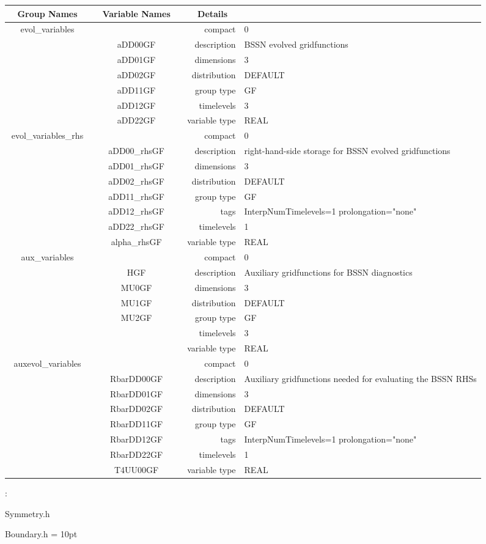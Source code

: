\begin{tabular*}{150mm}{|c|c@{\extracolsep{\fill}}|rl|} \hline 
~ {\bf Group Names} ~ & ~ {\bf Variable Names} ~  &{\bf Details} ~ & ~\\ 
\hline 
evol\_variables &  & compact & 0 \\ 
 & aDD00GF & description & BSSN evolved gridfunctions \\ 
 & aDD01GF & dimensions & 3 \\ 
 & aDD02GF & distribution & DEFAULT \\ 
 & aDD11GF & group type & GF \\ 
 & aDD12GF & timelevels & 3 \\ 
 & aDD22GF & variable type & REAL \\ 
\hline 
evol\_variables\_rhs &  & compact & 0 \\ 
 & aDD00\_rhsGF & description & right-hand-side storage for BSSN evolved gridfunctions \\ 
 & aDD01\_rhsGF & dimensions & 3 \\ 
 & aDD02\_rhsGF & distribution & DEFAULT \\ 
 & aDD11\_rhsGF & group type & GF \\ 
 & aDD12\_rhsGF & tags & InterpNumTimelevels=1 prolongation="none" \\ 
 & aDD22\_rhsGF & timelevels & 1 \\ 
 & alpha\_rhsGF & variable type & REAL \\ 
\hline 
aux\_variables &  & compact & 0 \\ 
 & HGF & description & Auxiliary gridfunctions for BSSN diagnostics \\ 
 & MU0GF & dimensions & 3 \\ 
 & MU1GF & distribution & DEFAULT \\ 
 & MU2GF & group type & GF \\ 
 &  & timelevels & 3 \\ 
 &  & variable type & REAL \\ 
\hline 
auxevol\_variables &  & compact & 0 \\ 
 & RbarDD00GF & description & Auxiliary gridfunctions needed for evaluating the BSSN RHSs \\ 
 & RbarDD01GF & dimensions & 3 \\ 
 & RbarDD02GF & distribution & DEFAULT \\ 
 & RbarDD11GF & group type & GF \\ 
 & RbarDD12GF & tags & InterpNumTimelevels=1 prolongation="none" \\ 
 & RbarDD22GF & timelevels & 1 \\ 
 & T4UU00GF & variable type & REAL \\ 
\hline 
\end{tabular*} 



\vspace{5mm}

: 

Symmetry.h

Boundary.h
\vspace{2mm}\parskip = 10pt 
